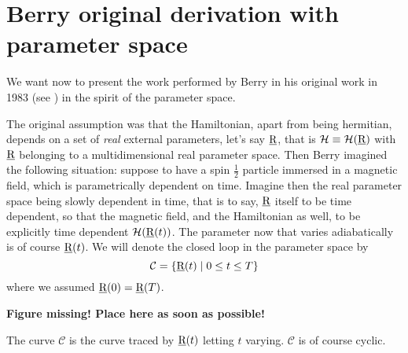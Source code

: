 \section{Berry original derivation with parameter space}
We want now to present the work performed by Berry in his original work in 1983 (see \cite{berry1985classical}) in the spirit of the parameter space.

The original assumption was that the Hamiltonian, apart from being hermitian, depends on a set of \emph{real} external parameters, let's say $ \underline{\textrm{R}} $, that is $ \mathcal{H}\equiv\mathcal{H}(\underline{\textrm{R}}) $ with $ \underline{\textrm{R}} $ belonging to a multidimensional real parameter space.
Then Berry imagined the following situation: 
suppose to have a spin $ \frac{1}{2} $ particle immersed in a magnetic field, which is parametrically dependent on time. Imagine then the real parameter space being slowly dependent in time, that is to say, $ \underline{\textrm{R}} $ itself to be time dependent, so that the magnetic field, and the Hamiltonian as well, to be explicitly time dependent $ \mathcal{H}(\underline{\textrm{R}}(t)) $. The parameter now that varies adiabatically is of course $ \underline{\textrm{R}}(t) $.
We will denote the closed loop in the parameter space by
\begin{equation}
\mathcal{C}=\left\{\underline{\textrm{R}}(t)\mid 0\leq t\leq T \right\}
\label{eq:Curve_C}
\end{equation}
where we assumed $ \underline{\textrm{R}}(0)=\underline{\textrm{R}}(T) $.

\textbf{Figure missing! Place here as soon as possible!}

The curve $ \mathcal{C} $ is the curve traced by $ \underline{\textrm{R}}(t) $ letting $ t $ varying. $ \mathcal{C} $ is of course cyclic.

